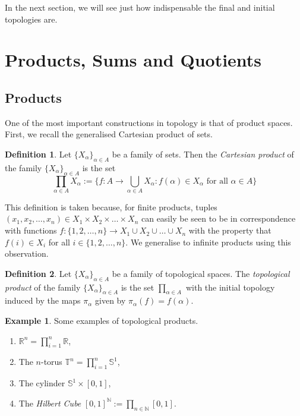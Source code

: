 \documentclass{book}
\theoremstyle{definition}
\newtheorem{definition}{Definition}[section]
\newtheorem{example}{Example}[section]
\theoremstyle{remark}
\newcommand{\R}{\mathbb{R}}
\newcommand{\N}{\mathbb{N}}
\begin{document}
In the next section, we will see just how indispensable the final and initial topologies are.

\section{Products, Sums and Quotients}
\subsection{Products}
One of the most important constructions in topology is that of product spaces. First, we recall the generalised Cartesian product of sets. 

\begin{definition}\label{product definition}
Let $\{X_\alpha\}_{\alpha\in A}$ be a family of sets. Then the \textit{Cartesian product} of the family $\{X_\alpha\}_{\alpha\in A}$ is the set $$\prod_{\alpha\in A}X_\alpha:=\Big\{f:A\to \bigcup_{\alpha\in A}X_\alpha:f(\alpha)\in X_\alpha\text{ for all }\alpha\in A\Big\}$$
\end{definition}
This definition is taken because, for finite products, tuples $(x_1,x_2,\hdots,x_n)\in X_1\times X_2\times \hdots\times X_n$ can easily be seen to be in correspondence with functions $f:\{1,2,\hdots,n\}\to X_1\cup X_2\cup\hdots\cup X_n$ with the property that $f(i)\in X_i$ for all $i\in\{1,2,\hdots,n\}$. We generalise to infinite products using this observation.

\begin{definition}
Let $\{X_\alpha\}_{\alpha\in A}$ be a family of topological spaces. The \textit{topological product} of the family $\{X_\alpha\}_{\alpha\in A}$ is the set $\prod_{\alpha\in A}$ with the initial topology induced by the maps $\pi_\alpha$ given by $\pi_\alpha(f)=f(\alpha)$.
\end{definition}

\begin{example}\label{product examples}Some examples of topological products.
\begin{enumerate}
    \item $\R^n=\prod_{i=1}^n\R$,
    \item The $n$-torus $\mathbb T^n=\prod_{i=1}^n\mathbb S^1$,
    \item The cylinder $\mathbb S^1\times[0,1]$,
    \item The \textit{Hilbert Cube} $[0,1]^\N:=\prod_{n\in\N} [0,1]$.
\end{enumerate}
\end{example}
\end{document}
